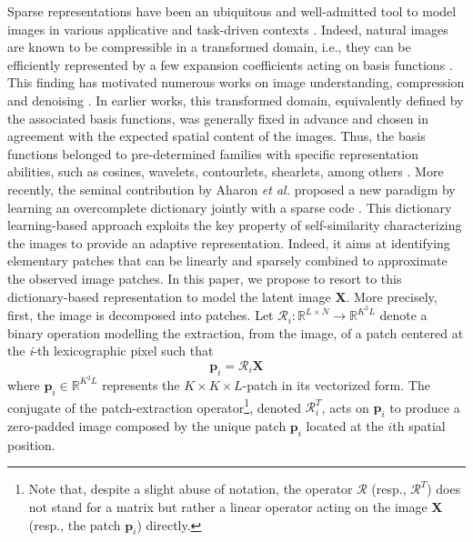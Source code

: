 \documentclass[review]{elsarticle}
\DeclareMathOperator*{\vect}{vec}
\newcommand{\Ndim}{L}
\newcommand{\Psize}{K}
\begin{document}
Sparse representations have been an ubiquitous and well-admitted tool to model images in various applicative and task-driven contexts \citep{mairal_sparse_2014}. Indeed, natural images are known to be compressible in a transformed domain, i.e., they can be efficiently represented by a few expansion coefficients acting on basis functions  \citep{mallat_wavelet_2009}. This finding has motivated numerous works on image understanding, compression and denoising \citep{olshausen_sparse_1997,chen_atomic_2001}. In earlier works, this transformed domain, equivalently defined by the associated basis functions, was generally fixed in advance and chosen in agreement with the expected spatial content of the images. Thus, the basis functions belonged to pre-determined families with specific representation abilities, such as cosines, wavelets, contourlets, shearlets, among others  \citep{mallat_wavelet_2009}. More recently, the seminal contribution by Aharon \emph{et al.} proposed a new paradigm by learning an overcomplete dictionary jointly with a sparse code \citep{aharon_k-svd_2006}. This dictionary learning-based approach exploits the key property of self-similarity characterizing the images to provide an adaptive representation. Indeed, it aims at identifying elementary patches that can be linearly and sparsely combined to approximate the observed image patches. In this paper, we propose to resort to this dictionary-based representation to model the latent image $\mathbf{X}$. More precisely, first, the image is decomposed into patches. %
Let $\mathcal{R}_{i} : \mathbb{R}^{\Ndim \times N} \rightarrow \mathbb{R}^{\Psize^{2}\Ndim}$ denote a binary operation modelling the extraction, from the image, of a patch centered at the \textit{i}-th lexicographic pixel such that
%
\begin{equation}
\label{eq:patch_extraction}
\mathbf{p}_{i} = \mathcal{R}_{i}\mathbf{X}
\end{equation}
%
where $\mathbf{p}_{i} \in \mathbb{R}^{\Psize^{2}\Ndim}$ represents the $\Psize \times \Psize \times \Ndim$-patch in its vectorized form. The conjugate of the patch-extraction operator\footnote{Note that, despite a slight abuse of notation, the operator $\mathcal{R}$ (resp., $\mathcal{R}^T$) does not stand for a matrix but rather a linear operator acting on the image $\mathbf{X}$ (resp., the patch $\mathbf{p}_{i}$) directly.}, denoted $\mathcal{R}^{T}_{i}$, acts on $\mathbf{p}_{i}$ to produce a zero-padded image composed by the unique patch $\mathbf{p}_{i}$ located at the $i$th spatial position.
\end{document}
